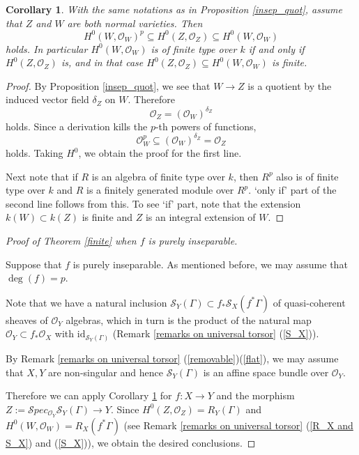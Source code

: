 \documentclass[12pt,twoside]{amsart}
\newtheorem{cor}[theo]{Corollary}
\theoremstyle{definition}
\newcommand\OO{\mathcal{O}}
\begin{document}
\begin{cor}\label{insep_fin}
With the same notations as in Proposition \ref{insep_quot},
assume that $Z$ and $W$ are both normal varieties. Then
\begin{equation*}
H^0(W,\mathcal{O}_W)^{p}\subseteq H^0(Z,\mathcal{O}_Z)\subseteq
H^0(W,\mathcal{O}_W)
\end{equation*}
holds. In particular
$H^0(W,\mathcal{O}_W)$ is of finite type over $k$ if and only if $H^0(Z,\mathcal{O}_Z)$ is, and
in that case $H^0(Z,\mathcal{O}_Z)\subseteq
H^0(W,\mathcal{O}_W)$ is finite.
\end{cor}
\begin{proof}
By Proposition \ref{insep_quot}, we see that $W\to Z$ is a quotient by the induced
vector field $\delta_Z$ on $W$. Therefore
\begin{equation*}
\mathcal{O}_Z=(\mathcal{O}_W)^{\delta_Z}
\end{equation*}
holds. Since a derivation kills the $p$-th powers of functions,
\begin{equation*}
\mathcal{O}_W^p\subseteq(\mathcal{O}_W)^{\delta_Z}=\mathcal{O}_Z
\end{equation*}
holds. Taking $H^0$, we obtain the proof for the first line.

Next note that if $R$ is an algebra of finite type over $k$, then
$R^p$ also is of finite type over $k$ and $R$ is a finitely generated module
over $R^p$. `only if' part of the second line follows from this.
To see `if' part, note that the extension $k(W)\subset k(Z)$ is finite and
$Z$ is an integral extension of $W$.
\end{proof}




\begin{proof}[Proof of Theorem \ref{finite} when $f$ is purely inseparable]

\ 

Suppose that $f$ is purely inseparable. As mentioned before, we may assume that $\deg{(f)}=p$.

Note that we have a natural inclusion $\mathcal{S}_Y(\Gamma)\subset f_{*}\mathcal{S}_X(f^{*}\Gamma)$
of quasi-coherent sheaves of $\mathcal{O}_Y$ algebras,
which in turn is the product of the natural map
$\mathcal{O}_Y\subset f_{*}\mathcal{O}_X$ with $\textrm{id}_{\mathcal{S}_Y(\Gamma)}$
(Remark \ref{remarks on universal torsor} (\ref{S_X})).

By Remark \ref{remarks on universal torsor} (\ref{removable})(\ref{flat}),
we may assume that $X,Y$ are non-singular and hence
$\mathcal{S}_Y(\Gamma)$ is an affine space bundle over $\mathcal{O}_Y$.

Therefore we can apply Corollary \ref{insep_fin} for $f:X\to Y$ and the morphism
$Z:=\mathcal{S}pec_{\OO_Y}\mathcal{S}_Y(\Gamma)\to Y$.
Since $H^0(Z,\OO_Z)=R_Y(\Gamma)$ and $H^0(W,\OO_W)=R_X(f^{*}\Gamma)$
(see Remark \ref{remarks on universal torsor} (\ref{R_X and S_X}) and (\ref{S_X})),
we obtain the desired conclusions.
\end{proof}
\end{document}
